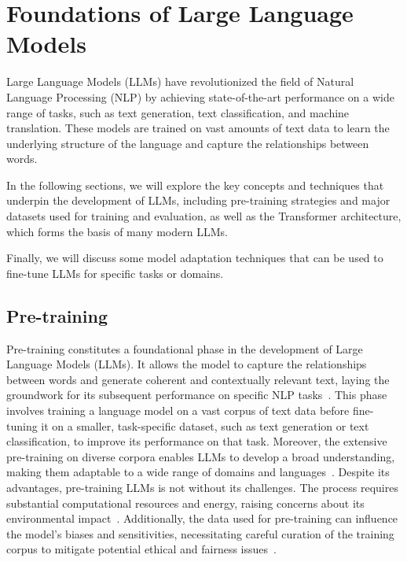 
\chapter{Foundations of Large Language Models}
\label{ch:foundations-of-large-language-models}

Large Language Models (LLMs) have revolutionized the field of Natural Language Processing (NLP) by achieving state-of-the-art performance on a wide range of tasks, such as text generation, text classification, and machine translation.
These models are trained on vast amounts of text data to learn the underlying structure of the language and capture the relationships between words.

In the following sections, we will explore the key concepts and techniques that underpin the development of LLMs, including pre-training strategies and major datasets used for training and evaluation, as well as the Transformer architecture, which forms the basis of many modern LLMs.

Finally, we will discuss some model adaptation techniques that can be used to fine-tune LLMs for specific tasks or domains.

\section{Pre-training}
\label{sec:pre-training}

Pre-training constitutes a foundational phase in the development of Large Language Models (LLMs).
It allows the model to capture the relationships between words and generate coherent and contextually relevant text, laying the groundwork for its subsequent performance on specific NLP tasks~\cite{devlin2019bert, brown2020language}.
This phase involves training a language model on a vast corpus of text data before fine-tuning it on a smaller, task-specific dataset, such as text generation or text classification, to improve its performance on that task.
Moreover, the extensive pre-training on diverse corpora enables LLMs to develop a broad understanding, making them adaptable to a wide range of domains and languages~\cite{liu2019roberta, radford2019language}.
Despite its advantages, pre-training LLMs is not without its challenges.
The process requires substantial computational resources and energy, raising concerns about its environmental impact~\cite{strubell2019energy}.
Additionally, the data used for pre-training can influence the model's biases and sensitivities, necessitating careful curation of the training corpus to mitigate potential ethical and fairness issues~\cite{bender2021dangers}.

